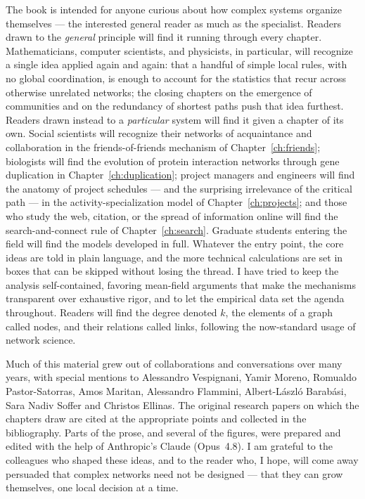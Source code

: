 \documentclass[10pt]{book}
\begin{document}
The book is intended for anyone curious about how complex systems organize 
themselves --- the interested general reader as much as the specialist. 
Readers drawn to the \emph{general} principle will find it running through 
every chapter. Mathematicians, computer scientists, and physicists, in 
particular, will recognize a single idea applied again and again: that a 
handful of simple local rules, with no global coordination, is enough to 
account for the statistics that recur across otherwise unrelated networks; 
the closing chapters on the emergence of communities and on the redundancy of 
shortest paths push that idea furthest. Readers drawn instead to a 
\emph{particular} system will find it given a chapter of its own. Social 
scientists will recognize their networks of acquaintance and collaboration in 
the friends-of-friends mechanism of Chapter~\ref{ch:friends}; biologists will 
find the evolution of protein interaction networks through gene duplication 
in Chapter~\ref{ch:duplication}; project managers and engineers will find the 
anatomy of project schedules --- and the surprising irrelevance of the 
critical path --- in the activity-specialization model of 
Chapter~\ref{ch:projects}; and those who study the web, citation, or the 
spread of information online will find the search-and-connect rule of 
Chapter~\ref{ch:search}. Graduate students entering the field will find the 
models developed in full. Whatever the entry point, the core ideas are told 
in plain language, and the more technical calculations are set in boxes that 
can be skipped without losing the thread. I have tried to keep the analysis 
self-contained, favoring mean-field arguments that make the mechanisms 
transparent over exhaustive rigor, and to let the empirical data set the 
agenda throughout. Readers will find the degree denoted $k$, the elements of 
a graph called nodes, and their relations called links, following the 
now-standard usage of network science.

Much of this material grew out of collaborations and conversations over many 
years, with special mentions to Alessandro Vespignani, Yamir Moreno, Romualdo 
Pastor-Satorras, Amos Maritan, Alessandro Flammini, Albert-L\'aszl\'o 
Barab\'asi, Sara Nadiv Soffer and Christos Ellinas. The original research 
papers on which the chapters draw are cited at the appropriate points and 
collected in the bibliography. Parts of the prose, and several of the 
figures, were prepared and edited with the help of Anthropic's Claude 
(Opus~4.8). I am grateful to the colleagues who shaped these ideas, and to 
the reader who, I hope, will come away persuaded that complex networks need 
not be designed --- that they can grow themselves, one local decision at a 
time.
\end{document}
